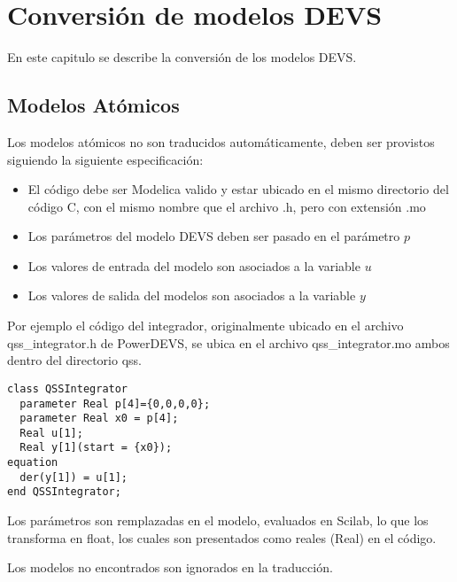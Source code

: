 \documentclass[a4paper,	11pt]{report}
\begin{document}
\chapter{Conversión de modelos DEVS}

En este capitulo se describe la conversión de los modelos DEVS.

\section{Modelos Atómicos}
Los modelos atómicos no son traducidos automáticamente, deben ser provistos siguiendo la siguiente especificación:

\begin{itemize}
\item El código debe ser Modelica valido y estar ubicado en el mismo directorio del código C, con el mismo nombre que el archivo .h, pero con extensión .mo
\item Los parámetros del modelo DEVS deben ser pasado en el parámetro $p$
\item Los valores de entrada del modelo son asociados a la variable $u$
\item Los valores de salida del modelos son asociados a la variable $y$
\end{itemize}

Por ejemplo el código del integrador, originalmente ubicado en el archivo qss\_integrator.h de PowerDEVS, se ubica en el archivo qss\_integrator.mo ambos dentro del directorio qss.

\begin{verbatim}
class QSSIntegrator
  parameter Real p[4]={0,0,0,0};
  parameter Real x0 = p[4];
  Real u[1];
  Real y[1](start = {x0});
equation
  der(y[1]) = u[1];
end QSSIntegrator;
\end{verbatim}

Los parámetros son remplazadas en el modelo, evaluados en Scilab, lo que los transforma en float, los cuales son presentados como reales (Real) en el código.

Los modelos no encontrados son ignorados en la traducción.
\end{document}
